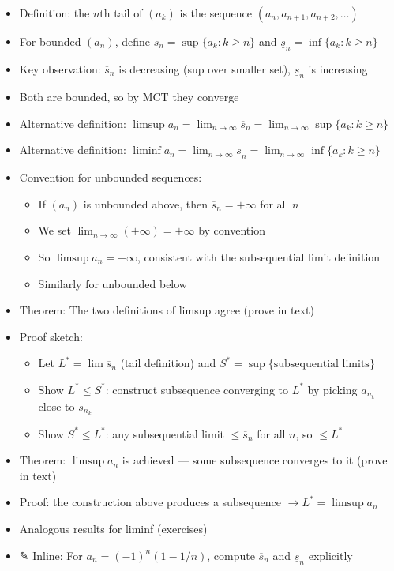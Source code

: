 \documentclass[
  10pt,
  letterpaper,
]{scrbook}
\providecommand{\tightlist}{%
  \setlength{\itemsep}{0pt}\setlength{\parskip}{0pt}}
\begin{document}
\begin{itemize}
\tightlist
\item
  Definition: the \(n\)th tail of \((a_k)\) is the sequence
  \((a_n, a_{n+1}, a_{n+2}, \ldots)\)
\item
  For bounded \((a_n)\), define
  \(\overline{s}_n = \sup\{a_k : k \geq n\}\) and
  \(\underline{s}_n = \inf\{a_k : k \geq n\}\)
\item
  Key observation: \(\overline{s}_n\) is decreasing (sup over smaller
  set), \(\underline{s}_n\) is increasing
\item
  Both are bounded, so by MCT they converge
\item
  Alternative definition:
  \(\limsup a_n = \lim_{n \to \infty} \overline{s}_n = \lim_{n \to \infty} \sup\{a_k : k \geq n\}\)
\item
  Alternative definition:
  \(\liminf a_n = \lim_{n \to \infty} \underline{s}_n = \lim_{n \to \infty} \inf\{a_k : k \geq n\}\)
\item
  Convention for unbounded sequences:

  \begin{itemize}
  \tightlist
  \item
    If \((a_n)\) is unbounded above, then \(\overline{s}_n = +\infty\)
    for all \(n\)
  \item
    We set \(\lim_{n \to \infty} (+\infty) = +\infty\) by convention
  \item
    So \(\limsup a_n = +\infty\), consistent with the subsequential
    limit definition
  \item
    Similarly for unbounded below
  \end{itemize}
\item
  Theorem: The two definitions of limsup agree (prove in text)
\item
  Proof sketch:

  \begin{itemize}
  \tightlist
  \item
    Let \(L^* = \lim \overline{s}_n\) (tail definition) and
    \(S^* = \sup\{\text{subsequential limits}\}\)
  \item
    Show \(L^* \leq S^*\): construct subsequence converging to \(L^*\)
    by picking \(a_{n_k}\) close to \(\overline{s}_{n_k}\)
  \item
    Show \(S^* \leq L^*\): any subsequential limit
    \(\leq \overline{s}_n\) for all \(n\), so \(\leq L^*\)
  \end{itemize}
\item
  Theorem: \(\limsup a_n\) is achieved --- some subsequence converges to
  it (prove in text)
\item
  Proof: the construction above produces a subsequence
  \(\to L^* = \limsup a_n\)
\item
  Analogous results for liminf (exercises)
\item
  ✎ Inline: For \(a_n = (-1)^n(1 - 1/n)\), compute \(\overline{s}_n\)
  and \(\underline{s}_n\) explicitly
\end{itemize}
\end{document}
